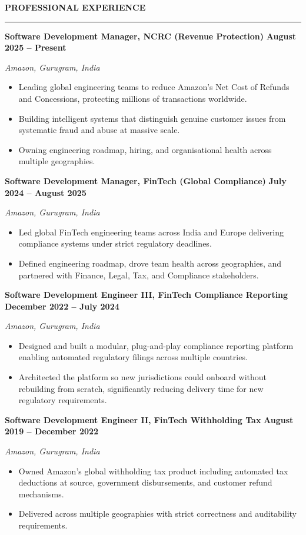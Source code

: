 \documentclass[9pt,a4paper]{extarticle}
\newcommand{\cvsection}[1]{%
  \vspace{2pt}%
  {\normalsize\bfseries\color{textdark}\MakeUppercase{#1}}\par
  \vspace{-1pt}%
  {\color{accent}\rule{\linewidth}{0.6pt}}\par
  \vspace{0pt}%
}
\newcommand{\role}[4]{%
  \textbf{#1} \hfill \textbf{#4}\par
  \textit{#2, #3}\par\vspace{0pt}
}
\begin{document}
\cvsection{Professional Experience}

\role{Software Development Manager, NCRC (Revenue Protection)}{Amazon}{Gurugram, India}{August 2025 -- Present}
\begin{itemize}
  \item Leading global engineering teams to reduce Amazon's Net Cost of Refunds and
        Concessions, protecting millions of transactions worldwide.
  \item Building intelligent systems that distinguish genuine customer issues from
        systematic fraud and abuse at massive scale.
  \item Owning engineering roadmap, hiring, and organisational health across multiple
        geographies.
\end{itemize}

\role{Software Development Manager, FinTech (Global Compliance)}{Amazon}{Gurugram, India}{July 2024 -- August 2025}
\begin{itemize}
  \item Led global FinTech engineering teams across India and Europe delivering
        compliance systems under strict regulatory deadlines.
  \item Defined engineering roadmap, drove team health across geographies, and
        partnered with Finance, Legal, Tax, and Compliance stakeholders.
\end{itemize}

\role{Software Development Engineer III, FinTech Compliance Reporting}{Amazon}{Gurugram, India}{December 2022 -- July 2024}
\begin{itemize}
  \item Designed and built a modular, plug-and-play compliance reporting platform
        enabling automated regulatory filings across multiple countries.
  \item Architected the platform so new jurisdictions could onboard without rebuilding
        from scratch, significantly reducing delivery time for new regulatory
        requirements.
\end{itemize}

\role{Software Development Engineer II, FinTech Withholding Tax}{Amazon}{Gurugram, India}{August 2019 -- December 2022}
\begin{itemize}
  \item Owned Amazon's global withholding tax product including automated tax
        deductions at source, government disbursements, and customer refund mechanisms.
  \item Delivered across multiple geographies with strict correctness and auditability
        requirements.
\end{itemize}
\end{document}
